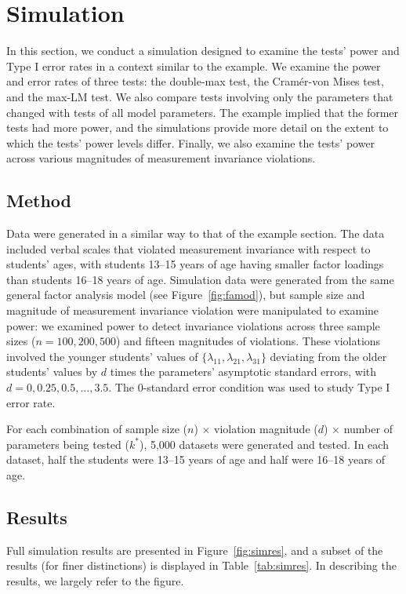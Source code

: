 \documentclass[man]{apa}
\begin{document}
\section{Simulation}

In this section, we conduct a simulation designed to
examine the tests' power and Type I error rates in a context
similar to the example.
We examine the power and error rates of three tests: the double-max test, the
Cram\'{e}r-von Mises test, and the max-LM test.  We also compare 
tests involving only the parameters that changed with tests of all model
parameters.  The example implied that the former tests had more
power, and the simulations provide more detail on the extent to which
the tests' power levels differ.
Finally, we also examine the tests' power across
various magnitudes of measurement invariance violations.

\subsection{Method}
Data were generated in a similar way to that of 
the example section.
The data included verbal scales that violated measurement invariance
with respect to students' ages, with students 13--15 years of age
having smaller factor loadings than students 16--18 years of age.  
Simulation data were generated from the same general factor analysis
model (see Figure~\ref{fig:famod}), but sample size and magnitude
of measurement 
invariance violation were manipulated to examine power:
we examined power to detect 
invariance violations across three sample sizes ($n=100,
200, 500$) and fifteen magnitudes of violations.  These violations
involved the younger students' values of $\{\lambda_{11},
\lambda_{21}, \lambda_{31}\}$ deviating from the older students'
values by $d$ 
times the parameters' asymptotic standard errors, with $d = 0, 0.25,
0.5, \dots, 3.5$.  The 0-standard error condition was
used to study Type I error rate.

For each combination of sample size ($n$) $\times$
violation magnitude ($d$) $\times$ number of parameters being tested
($k^{\ast}$),
5,000 datasets were generated and tested.  In each dataset, half the
students were 13--15 
years of age and half were 16--18 years of age.

\subsection{Results}
Full simulation results are presented in Figure~\ref{fig:simres}, and
a subset of the results (for finer distinctions) is displayed in
Table~\ref{tab:simres}.  In describing the results, we largely refer
to the figure.
\end{document}
